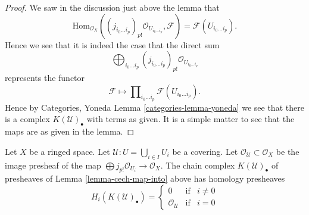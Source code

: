\begin{proof}
We saw in the discussion just above the lemma that
$$
\text{Hom}_{\mathcal{O}_X}(
(j_{i_0\ldots i_p})_{p!}\mathcal{O}_{U_{i_0\ldots i_p}},
\mathcal{F})
=
\mathcal{F}(U_{i_0\ldots i_p}).
$$
Hence we see that it is indeed the case that the direct sum
$$
\bigoplus\nolimits_{i_0 \ldots i_p}
(j_{i_0 \ldots i_p})_{p!}\mathcal{O}_{U_{i_0 \ldots i_p}}
$$
represents the functor
$$
\mathcal{F}
\longmapsto
\prod\nolimits_{i_0\ldots i_p} \mathcal{F}(U_{i_0\ldots i_p}).
$$
Hence by Categories, Yoneda Lemma \ref{categories-lemma-yoneda}
we see that there is a complex $K(\mathcal{U})_\bullet$ with terms
as given. It is a simple matter to see that the maps are as given
in the lemma.
\end{proof}

\begin{lemma}
\label{lemma-homology-complex}
Let $X$ be a ringed space.
Let $\mathcal{U} : U = \bigcup_{i \in I} U_i$ be a covering.
Let $\mathcal{O}_{\mathcal{U}} \subset \mathcal{O}_X$
be the image presheaf of the map
$\bigoplus j_{p!}\mathcal{O}_{U_i} \to \mathcal{O}_X$.
The chain complex $K(\mathcal{U})_\bullet$ of presheaves
of Lemma \ref{lemma-cech-map-into} above has homology presheaves
$$
H_i(K(\mathcal{U})_\bullet) =
\left\{
\begin{matrix}
0 & \text{if} & i \not = 0 \\
\mathcal{O}_{\mathcal{U}} & \text{if} & i = 0
\end{matrix}
\right.
$$
\end{lemma}

